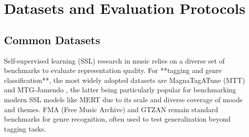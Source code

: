 \documentclass[12pt]{report}
\begin{document}
%
%
%

\section{Datasets and Evaluation Protocols}

\subsection{Common Datasets}
Self-supervised learning (SSL) research in music relies on a diverse set of benchmarks to evaluate representation quality. For **tagging and genre classification**, the most widely adopted datasets are MagnaTagATune (MTT) \cite{MagnaTagATune} and MTG-Jamendo \cite{MTGJamendo}, the latter being particularly popular for benchmarking modern SSL models like MERT \cite{li_mert_2024} due to its scale and diverse coverage of moods and themes. FMA (Free Music Archive) \cite{FMA_Dataset} and GTZAN \cite{GTZAN_Dataset} remain standard benchmarks for genre recognition, often used to test generalization beyond tagging tasks.
\end{document}
